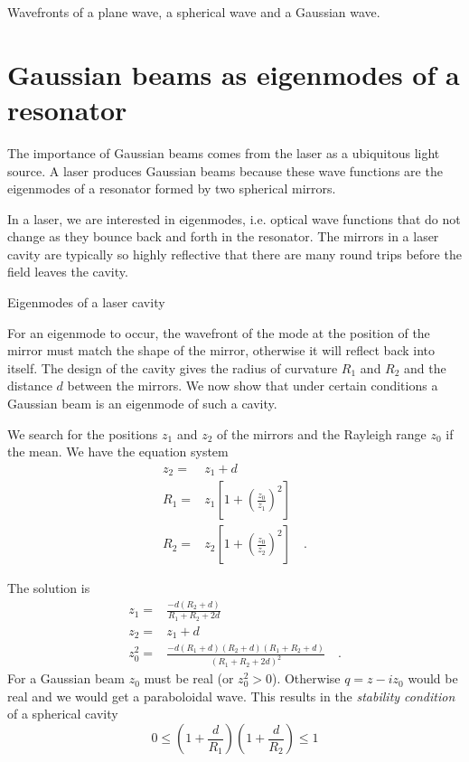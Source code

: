 \begin{marginfigure}
   \caption{Wavefronts of a plane wave, a spherical wave and a Gaussian wave.}
\end{marginfigure}





\section{Gaussian beams as eigenmodes of a resonator}
The importance of Gaussian beams comes from the laser as a ubiquitous light source. A laser produces Gaussian beams because these wave functions are the eigenmodes of a resonator formed by two spherical mirrors.

In a laser, we are interested in eigenmodes, i.e. optical wave functions that do not change as they bounce back and forth in the resonator. The mirrors in a laser cavity are typically so highly reflective that there are many round trips before the field leaves the cavity.


\begin{marginfigure}
   \caption{Eigenmodes of a laser cavity}
\end{marginfigure}





For an eigenmode to occur, the wavefront of the mode at the position of the mirror must match the shape of the mirror, otherwise it will reflect back into itself. The design of the cavity gives the radius of curvature $R_1$ and $R_2$ and the distance $d$ between the mirrors. We now show that under certain conditions a Gaussian beam is an eigenmode of such a cavity.

We search for the positions $z_1$ and $z_2$ of the mirrors and the Rayleigh range $z_0$ if the mean. We have the equation system
\begin{align}
    z_2 = & z_1 + d \\
    R_1 = & z_1 \left[ 1 + \left( \frac{z_0}{z_1} \right)^2 \right] \\
    R_2 = & z_2 \left[ 1 + \left( \frac{z_0}{z_2} \right)^2 \right]  \quad .
\end{align}

The solution is
\begin{align}
    z_1 = & \frac{-d (R_2 + d)}{R_1 + R_2 + 2d} \\
    z_2 = &z_1 + d  \\
    z_0^2 = & \frac{-d (R_1 +d)(R_2 + d)(R_1 + R_2 +d)}{(R_1 + R_2 + 2d)^2} \quad .
\end{align}
For a Gaussian beam $z_0$ must be real (or $z_0^2 > 0$). Otherwise $q = z - i z_0$ would be real and we would get a paraboloidal wave. This results in the \emph{stability condition} of a spherical cavity
\begin{equation}
    0 \le \left( 1 + \frac{d}{R_1} \right) \left( 1 + \frac{d}{R_2} \right) \le 1
\end{equation}

